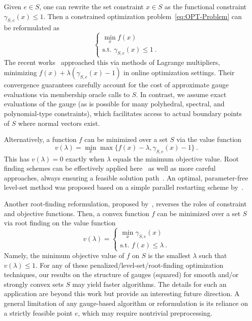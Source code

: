 \documentclass[sn-mathphys,Numbered]{sn-jnl}%
\begin{document}
Given $e \in S$, one can rewrite the set constraint $x\in S$ as the functional constraint $\gamma_{S,e}(x)\leq 1$. Then a constrained optimization problem~\eqref{eq:OPT-Problem} can be reformulated as
\begin{equation}
    \begin{cases} \min_x f(x)\\ \text{s.t. } \gamma_{S,e}(x)\leq 1 \ . \end{cases} 
\end{equation}
The recent works~\cite{Zakaria2022,Lu2023} approached this via methods of Lagrange multipliers, minimizing $f(x) + \lambda ( \gamma_{S,e}(x) -1)$ in online optimization settings. Their convergence guarantees carefully account for the cost of approximate gauge evaluations via membership oracle calls to $S$. In contrast, we assume exact evaluations of the gauge (as is possible for many polyhedral, spectral, and polynomial-type constraints), which facilitates access to actual boundary points of $S$ where normal vectors exist.

Alternatively, a function $f$ can be minimized over a set $S$ via the value function
\begin{equation}
    v(\lambda) = \min_x \max \{f(x)-\lambda, \gamma_{S,e}(x)-1\} \ .
\end{equation}
This has $v(\lambda)=0$ exactly when $\lambda$ equals the minimum objective value. Root finding schemes can be effectively applied here~\cite[Lemmas 2.3.4, 2.3.5, 2.3.6]{nesterov2018lectures} as well as more careful approaches, always ensuring a feasible solution path~\cite{lin2018}. An optimal, parameter-free level-set method was proposed based on a simple parallel restarting scheme by~\cite{lin2020parameter}.

Another root-finding reformulation, proposed by~\cite{aravkin2019level}, reverses the roles of constraint and objective functions. Then, a convex function $f$ can be minimized over a set $S$ via root finding on the value function
\begin{equation}
    v(\lambda) = \begin{cases} \min_x \gamma_{S,e}(x)\\ \text{s.t. } f(x)\leq \lambda \ . \end{cases} 
\end{equation}
Namely, the minimum objective value of $f$ on $S$ is the smallest $\lambda$ such that $v(\lambda)\leq 1$. For any of these penalized/level-set/root-finding optimization techniques, our results on the structure of gauges (squared) for smooth and/or strongly convex sets $S$ may yield faster algorithms. The details for such an application are beyond this work but provide an interesting future direction. A general limitation of any gauge-based algorithm or reformulation is its reliance on a strictly feasible point $e$, which may require nontrivial preprocessing. 
\end{document}
